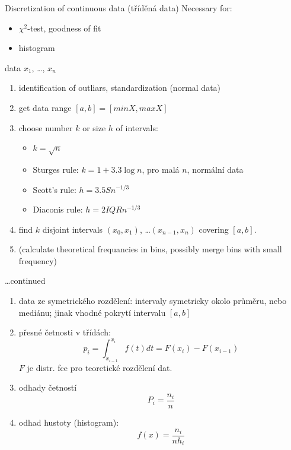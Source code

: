 \documentclass[smaller]{beamer}
\def\xskip{{\vspace{2ex}}}
\def\cz#1{{\small (#1)}}
\begin{document}
\begin{frame}{Discretization of continuous data \cz{tříděná data}}
Necessary for: 
\begin{itemize}
 \item $\chi^2$-test, goodness of fit
 \item histogram
\end{itemize}

\xskip
data $x_1$, \dots, $x_n$
\begin{enumerate}
 \item identification of outliars, standardization (normal data)
 \item get data range $[a,b]=[min X, max X]$
 \item choose number $k$ or size $h$ of intervals:
    \begin{itemize}
     \item $k=\sqrt{n}$
     \item Sturges rule: $k=1+3.3 \log n$, pro malá $n$, normální data
     \item Scott's rule: $h = 3.5 S n^{-1/3}$
     \item Diaconis rule: $h = 2 IQR n^{-1/3}$
    \end{itemize}
 \item find $k$ disjoint intervals $(x_0, x_1)$, \dots $(x_{n-1}, x_n)$ covering $[a,b]$.
 \item (calculate theoretical frequancies in bins, possibly merge bins with small frequency)
\end{enumerate}
\end{frame}


\begin{frame}{\dots continued}
\begin{enumerate}
 \item data ze symetrického rozdělení: intervaly symetricky okolo průměru, nebo mediánu;
       jinak vhodné pokrytí intervalu $[a,b]$
 \item přesné četnosti v třídách:
       \[
          p_i = \int_{x_{i-1}}^{x_i}f(t) dt = F(x_{i}) - F(x_{i-1})
       \]
       $F$ je distr. fce pro teoretické rozdělení dat.
 \item odhady četností
      \[
        P_i = \frac{n_i}{n}
      \]
 \item odhad hustoty (histogram):
      \[
         f(x)= \frac{n_i}{n h_i}
      \]
\end{enumerate}
\end{frame}
\end{document}
